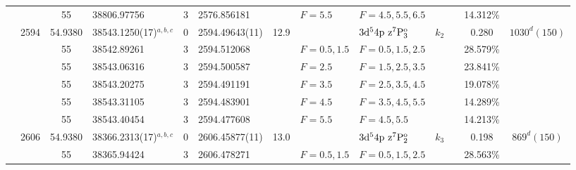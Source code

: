 \begin{table*}
\begin{center}
{\begin{tabular}{:l;l;c;l;c;l;c;l;l;c;c;c;c}
\rowstyle{\itshape}               &        & 55        & 38806.97756$^{}$                 & 3 &   2576.856181      &      & $F=5.5                                   $ & $F=4.5,5.5,6.5                           $ & $      $ &              & 14.312\%  & $     ^{}     $\\
                                  & 2594   & 54.9380   & 38543.1250(17)$^{a,b,c}$         & 0 &    2594.49643(11)  & 12.9 & $                                        $ & $3\rm{d}^54\rm{p~z}^7\rm{P}_3^{\rm o}    $ & $k_{2} $ &              & 0.280     & $ 1030^{d}(150)$\\
\rowstyle{\itshape}               &        & 55        & 38542.89261$^{}$                 & 3 &   2594.512068      &      & $F=0.5,1.5                               $ & $F=0.5,1.5,2.5                           $ & $      $ &              & 28.579\%  & $     ^{}     $\\
\rowstyle{\itshape}               &        & 55        & 38543.06316$^{}$                 & 3 &   2594.500587      &      & $F=2.5                                   $ & $F=1.5,2.5,3.5                           $ & $      $ &              & 23.841\%  & $     ^{}     $\\
\rowstyle{\itshape}               &        & 55        & 38543.20275$^{}$                 & 3 &   2594.491191      &      & $F=3.5                                   $ & $F=2.5,3.5,4.5                           $ & $      $ &              & 19.078\%  & $     ^{}     $\\
\rowstyle{\itshape}               &        & 55        & 38543.31105$^{}$                 & 3 &   2594.483901      &      & $F=4.5                                   $ & $F=3.5,4.5,5.5                           $ & $      $ &              & 14.289\%  & $     ^{}     $\\
\rowstyle{\itshape}               &        & 55        & 38543.40454$^{}$                 & 3 &   2594.477608      &      & $F=5.5                                   $ & $F=4.5,5.5                               $ & $      $ &              & 14.213\%  & $     ^{}     $\\
                                  & 2606   & 54.9380   & 38366.2313(17)$^{a,b,c}$         & 0 &    2606.45877(11)  & 13.0 & $                                        $ & $3\rm{d}^54\rm{p~z}^7\rm{P}_2^{\rm o}    $ & $k_{3} $ &              & 0.198     & $  869^{d}(150)$\\
\rowstyle{\itshape}               &        & 55        & 38365.94424$^{}$                 & 3 &   2606.478271      &      & $F=0.5,1.5                               $ & $F=0.5,1.5,2.5                           $ & $      $ &              & 28.563\%  & $     ^{}     $\\

\end{tabular}}
\end{center}
\end{table*}
